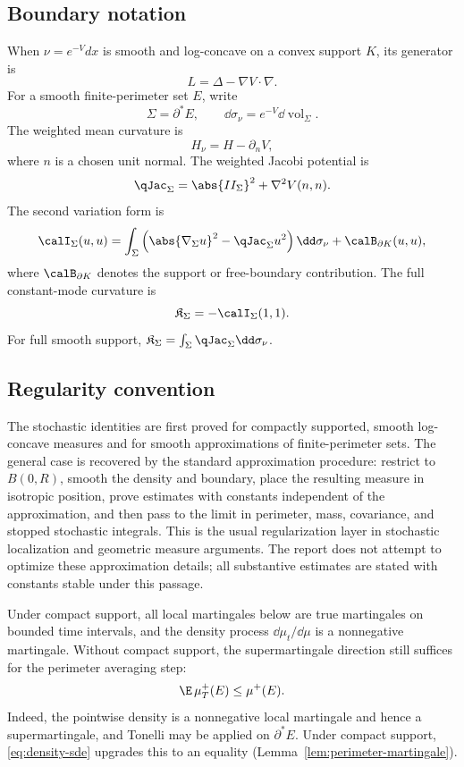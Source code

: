 \documentclass[../../main.tex]{subfiles}
\begin{document}
\subsection{Boundary notation}

When $\nu=e^{-V}dx$ is smooth and log-concave on a convex support $K$, its generator is
\[
  L=\Delta-\nabla V\cdot\nabla.
\]
For a smooth finite-perimeter set $E$, write
\[
  \Sigma=\partial^*E,
  \qquad
  \dd\sigma_\nu=e^{-V}\dd\operatorname{vol}_\Sigma.
\]
The weighted mean curvature is
\[
  H_\nu=H-\partial_nV,
\]
where $n$ is a chosen unit normal. The weighted Jacobi potential is
\[
  \qJac_\Sigma=\abs{II_\Sigma}^2+\nabla^2V(n,n).
\]
The second variation form is
\begin{equation}\label{eq:jacobi-form}
  \calI_\Sigma(u,u)
  =\int_\Sigma\left(\abs{\nabla_\Sigma u}^2-\qJac_\Sigma u^2\right)\dd\sigma_\nu
  +\calB_{\partial K}(u,u),
\end{equation}
where $\calB_{\partial K}$ denotes the support or free-boundary contribution. The full
constant-mode curvature is
\begin{equation}\label{eq:constant-mode-K}
  \mathfrak K_\Sigma=-\calI_\Sigma(1,1).
\end{equation}
For full smooth support, $\mathfrak K_\Sigma=\int_\Sigma\qJac_\Sigma\dd\sigma_\nu$.

\subsection{Regularity convention}

The stochastic identities are first proved for compactly supported, smooth log-concave measures and
for smooth approximations of finite-perimeter sets. The general case is recovered by the standard
approximation procedure: restrict to $B(0,R)$, smooth the density and boundary, place the resulting
measure in isotropic position, prove estimates with constants independent of the approximation,
and then pass to the limit in perimeter, mass, covariance, and stopped stochastic integrals. This is
the usual regularization layer in stochastic localization and geometric measure arguments. The
report does not attempt to optimize these approximation details; all substantive estimates are
stated with constants stable under this passage.

Under compact support, all local martingales below are true martingales on bounded time intervals,
and the density process $\dd\mu_t/\dd\mu$ is a nonnegative martingale. Without compact support, the
supermartingale direction still suffices for the perimeter averaging step:
\begin{equation}\label{eq:perimeter-supermartingale}
  \E\,\mu_T^+(E)\le\mu^+(E).
\end{equation}
Indeed, the pointwise density is a nonnegative local martingale and hence a supermartingale, and
Tonelli may be applied on $\partial^*E$. Under compact support, \eqref{eq:density-sde} upgrades
this to an equality (Lemma~\ref{lem:perimeter-martingale}).
\end{document}
